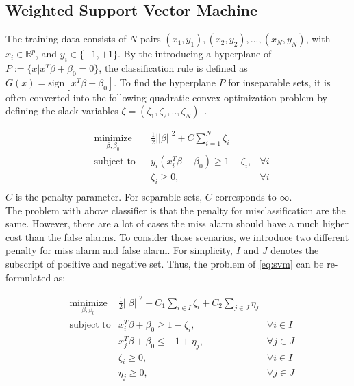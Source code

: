 \subsection{Weighted Support Vector Machine}
The training data consists of $N$ pairs $(x_1,y_1),(x_2,y_2),...,(x_N,y_N)$, with $x_i\in \mathbb{R}^p$, and $y_i \in \{-1,+1\}$. By the introducing a hyperplane of $P:=\{x| x^T\beta+\beta_0=0\}$, the classification rule is defined as $G(x)=\text{sign}[x^T\beta+\beta_0].$ To find the hyperplane $P$ for inseparable sets, it is often converted into the following quadratic convex optimization problem by defining the slack variables $\zeta=(\zeta_1,\zeta_2,..,\zeta_N)$~\cite{hastie2005elements}.

\begin{equation}
    \label{eq:svm}
    \begin{aligned}
& \underset{\beta, \beta_0}{\text{minimize}}
    & & \frac 1 2||\beta||^2 +C \sum_{i=1}^N \zeta_i \\
    & \text{subject to}
        & & y_i(x_i^T\beta+\beta_0) \ge 1-\zeta_i,&\forall i  \\
        & & & \zeta_i \ge 0, &\forall i \\
    \end{aligned}
\end{equation}
$C$ is the penalty parameter. For separable sets, $C$ corresponds to $\infty$.\\The problem with above classifier is that the penalty for misclassification are the same. However, there are a lot of cases the miss alarm should have a much higher cost than the false alarms. To consider those scenarios, we introduce two different penalty for miss alarm and false alarm. For simplicity, $I$ and $J$ denotes the subscript of positive and negative set. Thus, the problem of \ref{eq:svm} can be re-formulated as:

\begin{equation}
\label{eq:svm2}
\begin{aligned}
    & \underset{\beta, \beta_0}{\text{minimize}} & \frac 1 2||\beta||^2 + C_1 \sum_{i\in I} \zeta_i + C_2 \sum_{j\in J} \eta_j \\
    & \text{subject to} & x_i^T\beta+\beta_0 \ge 1-\zeta_i,&\forall i \in I  \\
      & & x_j^T\beta+\beta_0 \leq -1+\eta_j,&\forall j \in J  \\
      && \zeta_i \ge 0,&\forall i \in I  \\
      && \eta_j \ge 0,&\forall j \in J  \\
\end{aligned}
\end{equation}

